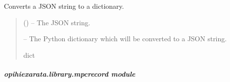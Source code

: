 \documentclass[letterpaper,11pt,english]{sphinxmanual}
\begin{document}

\begin{savenotes}\begin{fulllineitems}
\label{\detokenize{code/opihiexarata.library.json:opihiexarata.library.json.json_to_dictionary}}
\pysigstartsignatures
{}
\pysigstopsignatures
\sphinxAtStartPar
Converts a JSON string to a dictionary.
\begin{quote}\begin{description}
\sphinxAtStartPar
{} () – The JSON string.

\sphinxAtStartPar
{} – The Python dictionary which will be converted to a JSON string.

\sphinxAtStartPar
dict

\end{description}\end{quote}

\end{fulllineitems}\end{savenotes}


\sphinxstepscope


\subparagraph{opihiexarata.library.mpcrecord module}
\label{\detokenize{code/opihiexarata.library.mpcrecord:module-opihiexarata.library.mpcrecord}}\label{\detokenize{code/opihiexarata.library.mpcrecord:opihiexarata-library-mpcrecord-module}}\label{\detokenize{code/opihiexarata.library.mpcrecord::doc}}
\end{document}

